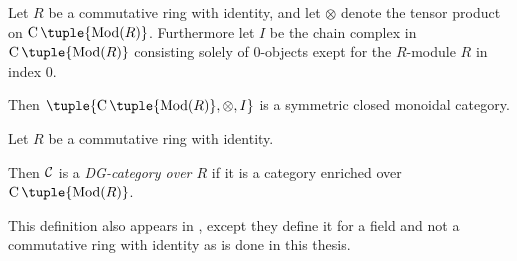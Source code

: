 \begin{fact}
    Let \( R \) be a commutative ring with identity, and let \( \otimes \) denote the tensor product on \( \C \tuple{\Mod(R)} \). Furthermore let \( I \) be the chain complex in \( \C \tuple{\Mod(R)} \) consisting solely of \( 0 \)-objects exept for the \( R \)-module \( R \) in index \( 0 \).

    Then \( \tuple{\C \tuple{\Mod(R)}, \otimes, I} \) is a symmetric closed monoidal category.
\end{fact}

\begin{definition}[DG-category]
    Let \( R \) be a commutative ring with identity.

    Then \( {\mathcal{C}} \) is a \emph{DG-category over \( R \)} if it is a category enriched over \( \C \tuple{\Mod(R)} \).
\end{definition}
This definition also appears in \cite[p. 29]{Jasso-Muro_2023}, except they define it for a field and not a commutative ring with identity as is done in this thesis.
